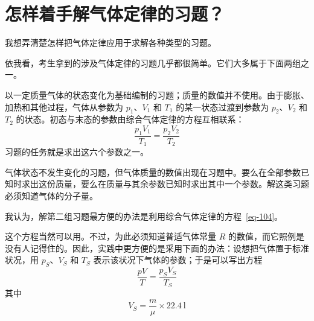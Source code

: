 
\chapter[怎样着手解气体定律的习题？]{怎样着手解气体定律的习题？\label{ch-21}}

\begin{dialogue}


\stda 我想弄清楚怎样把气体定律应用于求解各种类型的习题。

\tchr 依我看，考生拿到的涉及气体定律的习题几乎都很简单。它们大多属于下面两组之一。
\begin{description}[font=\bfseries, leftmargin=1cm]
\item[第一组：] 以一定质量气体的状态变化为基础编制的习题；质量的数值并不使用。由于膨胀、加热和其他过程，气体从参数为 $p_{1}$、$V_{1}$ 和 $T_{1}$ 的某一状态过渡到参数为 $p_{2}$、$V_{2}$ 和 $T_{2}$ 的状态。初态与末态的参数由综合气体定律的方程互相联系：
\begin{equation}%
\frac{p_{1} V_{1}}{T_{1}}  = \frac{p_{2} V_{2}}{T_{2}}
\label{119}
\end{equation}
习题的任务就是求出这六个参数之一。

\item[第二组：] 气体状态不发生变化的习题，但气体质量的数值出现在习题中。要么在全部参数已知时求出这份质量，要么在质量与其余参数已知时求出其中一个参数。解这类习题必须知道气体的分子量。
\end{description}

\stdb 我认为，解第二组习题最方便的办法是利用综合气体定律的方程~\eqref{eq-104}。

\tchr 这个方程当然可以用。不过，为此必须知道普适气体常量 $R$ 的数值，而它照例是没有人记得住的。因此，实践中更方便的是采用下面的办法：设想把气体置于标准状况，用 $p_{S}$、$V_{S}$ 和 $T_{S}$ 表示该状况下气体的参数；于是可以写出方程
\begin{equation}%
\frac{p V}{T} = \frac{p_{S} V_{S}}{T_{S}}
\label{eq-120}
\end{equation}
其中
\begin{equation*}%
V_{S} =  \frac{m}{\mu} \times \SI{22.4}{\litre}
\end{equation*}


\end{dialogue}
